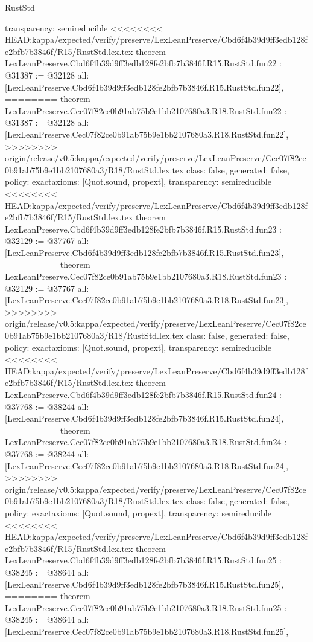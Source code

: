\begin{lexlean}{RustStd}
\begin{coremodule}
{\begin{coremodule}
{{{{{{{{{{{{{{{{{{{{{{{{{  transparency: semireducible
}
<<<<<<<< HEAD:kappa/expected/verify/preserve/LexLeanPreserve/Cbd6f4b39d9ff3edb128fe2bfb7b3846f/R15/RustStd.lex.tex
theorem LexLeanPreserve.Cbd6f4b39d9ff3edb128fe2bfb7b3846f.R15.RustStd.fun22 : @31387 := @32128 {
  all: [LexLeanPreserve.Cbd6f4b39d9ff3edb128fe2bfb7b3846f.R15.RustStd.fun22],
========
theorem LexLeanPreserve.Cec07f82ce0b91ab75b9e1bb2107680a3.R18.RustStd.fun22 : @31387 := @32128 {
  all: [LexLeanPreserve.Cec07f82ce0b91ab75b9e1bb2107680a3.R18.RustStd.fun22],
>>>>>>>> origin/release/v0.5:kappa/expected/verify/preserve/LexLeanPreserve/Cec07f82ce0b91ab75b9e1bb2107680a3/R18/RustStd.lex.tex
  class: false,
  generated: false,
  policy: exact{axioms: [Quot.sound, propext]},
  transparency: semireducible
}
<<<<<<<< HEAD:kappa/expected/verify/preserve/LexLeanPreserve/Cbd6f4b39d9ff3edb128fe2bfb7b3846f/R15/RustStd.lex.tex
theorem LexLeanPreserve.Cbd6f4b39d9ff3edb128fe2bfb7b3846f.R15.RustStd.fun23 : @32129 := @37767 {
  all: [LexLeanPreserve.Cbd6f4b39d9ff3edb128fe2bfb7b3846f.R15.RustStd.fun23],
========
theorem LexLeanPreserve.Cec07f82ce0b91ab75b9e1bb2107680a3.R18.RustStd.fun23 : @32129 := @37767 {
  all: [LexLeanPreserve.Cec07f82ce0b91ab75b9e1bb2107680a3.R18.RustStd.fun23],
>>>>>>>> origin/release/v0.5:kappa/expected/verify/preserve/LexLeanPreserve/Cec07f82ce0b91ab75b9e1bb2107680a3/R18/RustStd.lex.tex
  class: false,
  generated: false,
  policy: exact{axioms: [Quot.sound, propext]},
  transparency: semireducible
}
<<<<<<<< HEAD:kappa/expected/verify/preserve/LexLeanPreserve/Cbd6f4b39d9ff3edb128fe2bfb7b3846f/R15/RustStd.lex.tex
theorem LexLeanPreserve.Cbd6f4b39d9ff3edb128fe2bfb7b3846f.R15.RustStd.fun24 : @37768 := @38244 {
  all: [LexLeanPreserve.Cbd6f4b39d9ff3edb128fe2bfb7b3846f.R15.RustStd.fun24],
========
theorem LexLeanPreserve.Cec07f82ce0b91ab75b9e1bb2107680a3.R18.RustStd.fun24 : @37768 := @38244 {
  all: [LexLeanPreserve.Cec07f82ce0b91ab75b9e1bb2107680a3.R18.RustStd.fun24],
>>>>>>>> origin/release/v0.5:kappa/expected/verify/preserve/LexLeanPreserve/Cec07f82ce0b91ab75b9e1bb2107680a3/R18/RustStd.lex.tex
  class: false,
  generated: false,
  policy: exact{axioms: [Quot.sound, propext]},
  transparency: semireducible
}
<<<<<<<< HEAD:kappa/expected/verify/preserve/LexLeanPreserve/Cbd6f4b39d9ff3edb128fe2bfb7b3846f/R15/RustStd.lex.tex
theorem LexLeanPreserve.Cbd6f4b39d9ff3edb128fe2bfb7b3846f.R15.RustStd.fun25 : @38245 := @38644 {
  all: [LexLeanPreserve.Cbd6f4b39d9ff3edb128fe2bfb7b3846f.R15.RustStd.fun25],
========
theorem LexLeanPreserve.Cec07f82ce0b91ab75b9e1bb2107680a3.R18.RustStd.fun25 : @38245 := @38644 {
  all: [LexLeanPreserve.Cec07f82ce0b91ab75b9e1bb2107680a3.R18.RustStd.fun25],
}}}}}}}}}}}}}}}}}}}}}}}}}}}}}
\end{coremodule}}
\end{coremodule}
\end{lexlean}
